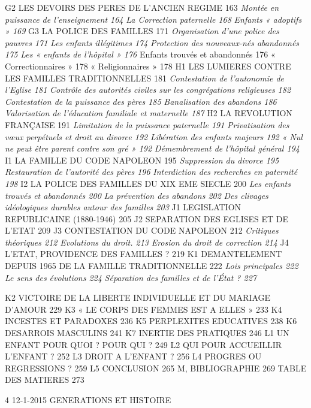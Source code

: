 G2 LES DEVOIRS DES PERES DE L'ANCIEN REGIME	163
 \emph{Montée en puissance de l'enseignement	164}
 \emph{La Correction paternelle	168}
 \emph{Enfants « adoptifs »	169}
G3 LA POLICE DES FAMILLES	171
 \emph{Organisation d'une police des pauvres	171}
 \emph{Les enfants illégitimes	174}
 \emph{Protection des nouveaux-nés abandonnés	175}
 \emph{Les « enfants de l'hôpital »	176}
 Enfants trouvés et abandonnés	176
 « Correctionnaires »	178
 « Religionnaires »	178
H1 LES LUMIERES CONTRE LES FAMILLES TRADITIONNELLES	181
 \emph{Contestation de l'autonomie de l'Eglise	181}
 \emph{Contrôle des autorités civiles sur les congrégations religieuses	182}
 \emph{Contestation de la puissance des pères	185}
 \emph{Banalisation des abandons	186}
 \emph{Valorisation de l'éducation familiale et maternelle	187}
H2 LA REVOLUTION FRANÇAISE	191
 \emph{Limitation de la puissance paternelle	191}
 \emph{Privatisation des vœux perpétuels et droit au divorce	192}
 \emph{Libération des enfants majeurs	192}
 \emph{« Nul ne peut être parent contre son gré »	192}
 \emph{Démembrement de l'hôpital général	194}
I1 LA FAMILLE DU CODE NAPOLEON	195
 \emph{Suppression du divorce	195}
 \emph{Restauration de l'autorité des pères	196}
 \emph{Interdiction des recherches en paternité	198}
I2 LA POLICE DES FAMILLES DU XIX EME SIECLE	200
 \emph{Les enfants trouvés et abandonnés	200}
 \emph{La prévention des abandons	202}
 \emph{Des clivages idéologiques durables autour des familles	203}
J1 LEGISLATION REPUBLICAINE (1880-1946)	205
J2 SEPARATION DES EGLISES ET DE L'ETAT	209
J3 CONTESTATION DU CODE NAPOLEON	212
 \emph{Critiques théoriques	212}
 \emph{Evolutions du droit.	213}
 \emph{Erosion du droit de correction	214}
J4 L'ETAT, PROVIDENCE DES FAMILLES ?	219
K1 DEMANTELEMENT DEPUIS 1965 DE LA FAMILLE TRADITIONNELLE	222
 \emph{Lois principales	222}
 \emph{Le sens des évolutions	224}
 \emph{Séparation des familles et de l'État ?	227
}
 
K2 VICTOIRE DE LA LIBERTE INDIVIDUELLE ET DU MARIAGE D'AMOUR	229
K3 « LE CORPS DES FEMMES EST A ELLES »	233
K4 INCESTES ET PARADOXES	236
K5 PERPLEXITES EDUCATIVES	238
K6 DESARROIS MASCULINS	241
K7 INERTIE DES PRATIQUES	246
L1 UN ENFANT POUR QUOI ? POUR QUI ?	249
L2 QUI POUR ACCUEILLIR L'ENFANT ?	252
L3 DROIT A L'ENFANT ?	256
L4 PROGRES OU REGRESSIONS ?	259
L5 CONCLUSION	265
M, BIBLIOGRAPHIE	269
TABLE DES MATIERES	273
 
 
 
 
 


 
 
 
 4
12-1-2015 GENERATIONS ET HISTOIRE
 
